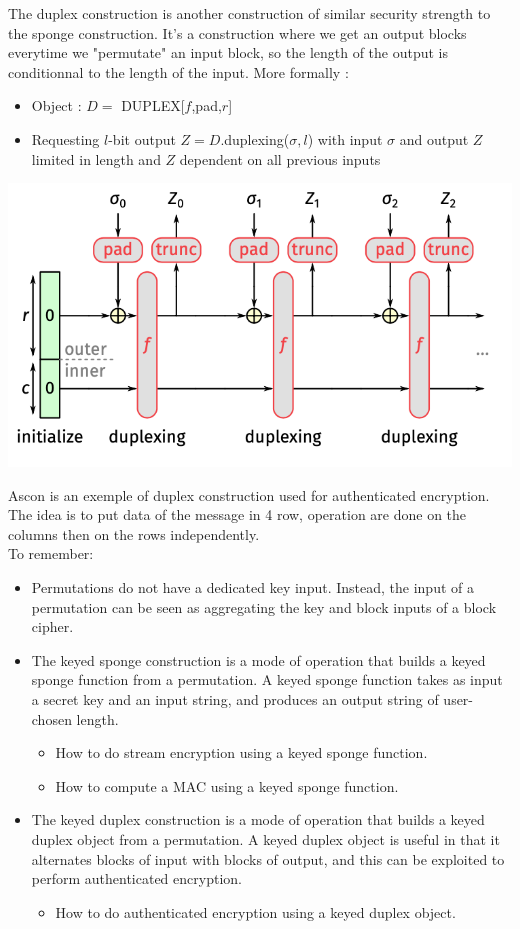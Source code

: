 \documentclass[11pt,a4paper]{report}
\begin{document}
The duplex construction is another construction of similar security strength to the sponge construction. It's a construction where we get an output blocks everytime we "permutate" an input block, so the length of the output is conditionnal to the length of the input. More formally :
\begin{itemize}
\item Object : $D = $ DUPLEX[$f$,pad,$r$]
\item Requesting $l$-bit output $Z = D$.duplexing($\sigma, l$) with input $\sigma$ and output $Z$ limited in length and $Z$ dependent on all previous inputs
\end{itemize}

\begin{center}
\includegraphics[scale=0.5]{img/img15.png}
\end{center}

Ascon is an exemple of duplex construction used for authenticated encryption. The idea is to put data of the message in 4 row, operation are done on the columns then on the rows independently.\\

To remember:
\begin{itemize}
\item Permutations do not have a dedicated key input. Instead, the input of a permutation can be seen as aggregating the key and block inputs of a block cipher.
\item The keyed sponge construction is a mode of operation that builds a keyed sponge function from a permutation. A keyed sponge function takes as input a secret key and an input string, and produces an output string of user-chosen length.
\begin{itemize}
\item How to do stream encryption using a keyed sponge function.
\item How to compute a MAC using a keyed sponge function.
\end{itemize}
\item The keyed duplex construction is a mode of operation that builds a keyed duplex object from a permutation. A keyed duplex object is useful in that it alternates blocks of input with blocks of output, and this can be exploited to perform authenticated encryption.
\begin{itemize}
\item How to do authenticated encryption using a keyed duplex object.
\end{itemize}
\end{itemize}
\end{document}
